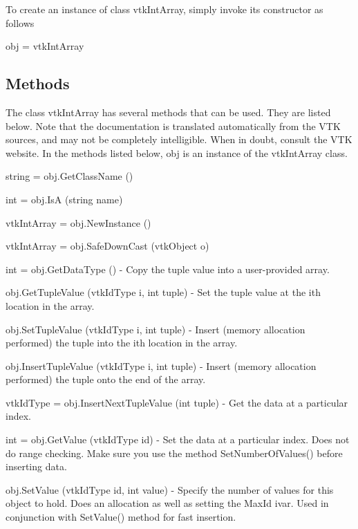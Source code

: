 To create an instance of class vtk\-Int\-Array, simply invoke its constructor as follows \begin{DoxyVerb}  obj = vtkIntArray
\end{DoxyVerb}
 \hypertarget{vtkwidgets_vtkxyplotwidget_Methods}{}\subsection{Methods}\label{vtkwidgets_vtkxyplotwidget_Methods}
The class vtk\-Int\-Array has several methods that can be used. They are listed below. Note that the documentation is translated automatically from the V\-T\-K sources, and may not be completely intelligible. When in doubt, consult the V\-T\-K website. In the methods listed below, {\ttfamily obj} is an instance of the vtk\-Int\-Array class. 
\begin{DoxyItemize}
\item {\ttfamily string = obj.\-Get\-Class\-Name ()}  
\item {\ttfamily int = obj.\-Is\-A (string name)}  
\item {\ttfamily vtk\-Int\-Array = obj.\-New\-Instance ()}  
\item {\ttfamily vtk\-Int\-Array = obj.\-Safe\-Down\-Cast (vtk\-Object o)}  
\item {\ttfamily int = obj.\-Get\-Data\-Type ()} -\/ Copy the tuple value into a user-\/provided array.  
\item {\ttfamily obj.\-Get\-Tuple\-Value (vtk\-Id\-Type i, int tuple)} -\/ Set the tuple value at the ith location in the array.  
\item {\ttfamily obj.\-Set\-Tuple\-Value (vtk\-Id\-Type i, int tuple)} -\/ Insert (memory allocation performed) the tuple into the ith location in the array.  
\item {\ttfamily obj.\-Insert\-Tuple\-Value (vtk\-Id\-Type i, int tuple)} -\/ Insert (memory allocation performed) the tuple onto the end of the array.  
\item {\ttfamily vtk\-Id\-Type = obj.\-Insert\-Next\-Tuple\-Value (int tuple)} -\/ Get the data at a particular index.  
\item {\ttfamily int = obj.\-Get\-Value (vtk\-Id\-Type id)} -\/ Set the data at a particular index. Does not do range checking. Make sure you use the method Set\-Number\-Of\-Values() before inserting data.  
\item {\ttfamily obj.\-Set\-Value (vtk\-Id\-Type id, int value)} -\/ Specify the number of values for this object to hold. Does an allocation as well as setting the Max\-Id ivar. Used in conjunction with Set\-Value() method for fast insertion.  

\end{DoxyItemize}
